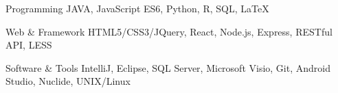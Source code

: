 

\begin{cvskills}

  \cvskill
    {Programming} %
    {JAVA, JavaScript ES6, Python, R, SQL, LaTeX} %

  \cvskill
    {Web \& Framework} %
    {HTML5/CSS3/JQuery, React, Node.js, Express, RESTful API, LESS} %

  \cvskill
    {Software \& Tools} %
    {IntelliJ, Eclipse, SQL Server, Microsoft Visio, Git, Android Studio, Nuclide, UNIX/Linux} %

  \vspace{-5mm}

\end{cvskills}
